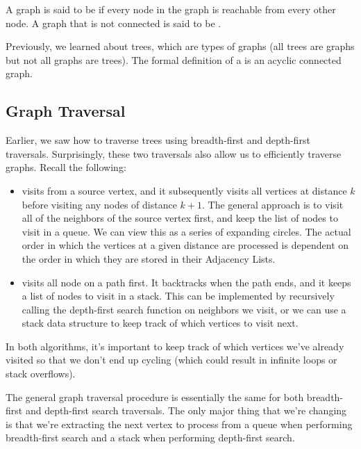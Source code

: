 A graph is said to be  if every node in the graph is reachable from every other node. A graph that is not connected is said to be . 


Previously, we learned about trees, which are types of graphs (all trees are graphs but not all graphs are trees). The formal definition of a  is an acyclic connected graph. 

\subsection{Graph Traversal}

Earlier, we saw how to traverse trees using breadth-first and depth-first traversals. Surprisingly, these two traversals also allow us to efficiently traverse graphs. Recall the following:

\begin{itemize}
    \item {} visits from a source vertex, and it subsequently visits all vertices at distance $k$ before visiting any nodes of distance $k + 1$. The general approach is to visit all of the neighbors of the source vertex first, and keep the list of nodes to visit in a queue. We can view this as a series of expanding circles. The actual order in which the vertices at a given distance are processed is dependent on the order in which they are stored in their Adjacency Lists. 
    \item {} visits all node on a path first. It backtracks when the path ends, and it keeps a list of nodes to visit in a stack. This can be implemented by recursively calling the depth-first search function on neighbors we visit, or we can use a stack data structure to keep track of which vertices to visit next.
\end{itemize}

In both algorithms, it's important to keep track of which vertices we've already visited so that we don't end up cycling (which could result in infinite loops or stack overflows). 

The general graph traversal procedure is essentially the same for both breadth-first and depth-first search traversals. The only major thing that we're changing is that we're extracting the next vertex to process from a queue when performing breadth-first search and a stack when performing depth-first search. 
